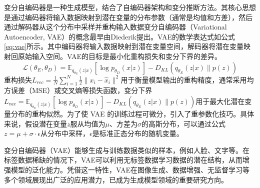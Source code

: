 变分自编码器是一种生成模型，结合了自编码器架构和变分推断方法。其核心思想是通过编码器将输入数据映射到潜在变量的分布参数（通常是均值和方差），然后通过解码器从这个分布中采样并重构输入数据变分自编码器（Variational Autoencoder, VAE）的概念最早由Diederik提出。VAE的数学表达式如公式\eqref{eq:vae}所示。其中编码器将输入数据映射到潜在变量空间，解码器将潜在变量映射回原始输入空间。VAE的目标是最小化重构损失和变分下界的差异\cite{kingma2013auto}。
\begin{equation}
  \mathcal{L}(\theta_E, \theta_D) = \mathbb{E}_{q_{\theta_E}(z|x)} \left[ \log p_{\theta_D}(x|z) \right] - D_{KL}(q_{\theta_E}(z|x) \| p(z)) \label{eq:vae}
\end{equation}
重构损失$L_{rec} = \frac{1}{N} \sum_{i=1}^{N} \frac{1}{2} \| x_i - \hat{x}_i \|^2$用于衡量模型输出的重构精度，通常采用均方误差（MSE）或交叉熵等损失函数，变分下界$L_{vae} = \mathbb{E}_{q_{\theta_E}(z|x)} \left[ \log p_{\theta_D}(x|z) \right] - D_{KL}(q_{\theta_E}(z|x) \| p(z))
$用于最大化潜在变量分布的重构似然。为了使 VAE 的训练过程可微分，引入了重参数化技巧。具体来说，假设潜在变量$z$服从均值为$\mu$、方差为$\sigma$的高斯分布，可以通过公式$z = \mu + \sigma \cdot \epsilon$从分布中采样，$\epsilon$是标准正态分布的随机变量。

变分自编码器（VAE）能够生成与训练数据类似的样本，例如人脸、文字等。在标签数据稀缺的情况下，VAE可以利用无标签数据学习数据的潜在结构，从而增强模型的泛化能力。凭借这一特性，VAE在图像生成、数据增强、无监督学习等多个领域展现出广泛的应用潜力，已成为生成模型领域的重要研究方向。
